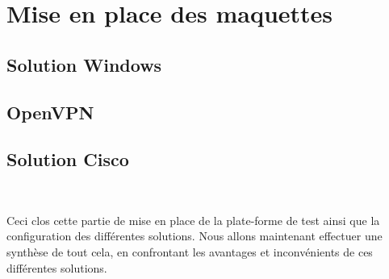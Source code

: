\section{Mise en place des maquettes}

\subsection{Solution Windows}


\subsection{OpenVPN}


\subsection{Solution Cisco}


~

Ceci clos cette partie de mise en place de la plate-forme de test ainsi que la configuration des différentes solutions. Nous allons maintenant effectuer une synthèse de tout cela, en confrontant les avantages et inconvénients de ces différentes solutions.

\pagebreak
